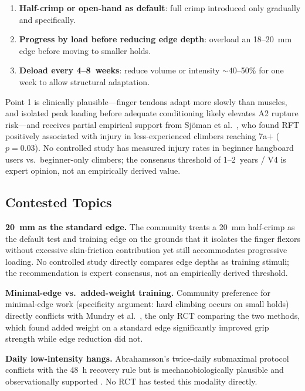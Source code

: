 \documentclass[12pt,a4paper]{article}
\begin{document}
\begin{folklorebox}[title=Practitioner Consensus --- Majority Agreement]
\begin{enumerate}[noitemsep, topsep=2pt]
  \item \textbf{Half-crimp or open-hand as default}: full crimp introduced only gradually and specifically.
  \item \textbf{Progress by load before reducing edge depth}: overload an 18--20~mm edge before moving to smaller holds.
  \item \textbf{Deload every 4--8~weeks}: reduce volume or intensity ${\sim}40$--50\% for one week to allow structural adaptation.
\end{enumerate}
\end{folklorebox}

\begin{bioplausbox}
Point 1 is clinically plausible---finger tendons adapt more slowly than muscles, and isolated peak loading before adequate conditioning likely elevates A2 rupture risk---and receives partial empirical support from Sjöman et al.\ \cite{sjoman2023}, who found RFT positively associated with injury in less-experienced climbers reaching 7a$+$ ($p=0.03$). No controlled study has measured injury rates in beginner hangboard users vs.\ beginner-only climbers; the consensus threshold of 1--2~years / V4 is expert opinion, not an empirically derived value.
\end{bioplausbox}

\subsection*{Contested Topics}

\textbf{20~mm as the standard edge.} The community treats a 20~mm half-crimp as the default test and training edge on the grounds that it isolates the finger flexors without excessive skin-friction contribution yet still accommodates progressive loading. No controlled study directly compares edge depths as training stimuli; the recommendation is expert consensus, not an empirically derived threshold.

\textbf{Minimal-edge vs.\ added-weight training.} Community preference for minimal-edge work (specificity argument: hard climbing occurs on small holds) directly conflicts with Mundry et al.\ \cite{mundry2021}, the only RCT comparing the two methods, which found added weight on a standard edge significantly improved grip strength while edge reduction did not.

\textbf{Daily low-intensity hangs.} Abrahamsson's twice-daily submaximal protocol conflicts with the 48~h recovery rule but is mechanobiologically plausible and observationally supported \cite{gilmore2024}. No RCT has tested this modality directly.
\end{document}
